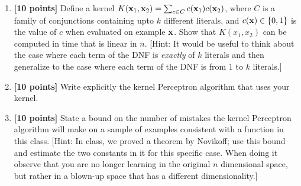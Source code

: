 \begin{enumerate}
  \begin{enumerate}
  \item \textbf{[10 points]} Define a kernel $K({\bf x}_1, {\bf x}_2) = \sum_{c \in C} c({\bf x}_1) c({\bf x}_2)$,
    where $C$ is a family of conjunctions containing upto $k$ different
    literals, and $c({\bf x}) \in \{0, 1\}$ is the value of $c$ when evaluated
    on example ${\bf x}$. Show that $K(x_1,x_2)$ can be computed in time that is linear in $n$. [Hint: It would be useful to think about the case where each term of the 
  DNF is \emph{exactly} of $k$ literals and then generalize to the case where each term of the DNF 
  is from $1$ to $k$ literals.]


  \item \textbf{[10 points]} Write explicitly the kernel Perceptron algorithm that uses
    your kernel.

  \item \textbf{[10 points]} State a bound on the number of mistakes the kernel Perceptron algorithm will
    make on a sample of examples consistent with a function in this class.
[Hint: In class, we proved a theorem by Novikoff; use this bound and estimate the two constants in it for this specific case. 
When doing it observe that you are no longer learning in the original $n$ dimensional space, but rather in a blown-up space 
that has a different dimensionality.]
\end{enumerate}


\end{enumerate}



